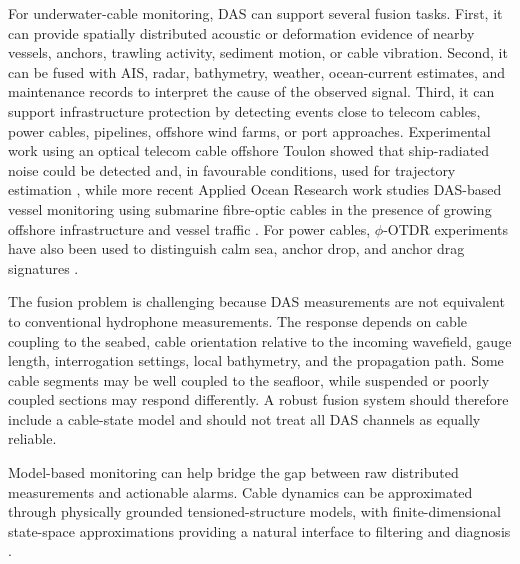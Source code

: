 \documentclass[graybox,envcountchap]{style/SNmono}
\begin{document}
For underwater-cable monitoring, DAS can support several fusion tasks. First, it can provide spatially distributed acoustic or deformation evidence of nearby vessels, anchors, trawling activity, sediment motion, or cable vibration. Second, it can be fused with AIS, radar, bathymetry, weather, ocean-current estimates, and maintenance records to interpret the cause of the observed signal. Third, it can support infrastructure protection by detecting events close to telecom cables, power cables, pipelines, offshore wind farms, or port approaches. Experimental work using an optical telecom cable offshore Toulon showed that ship-radiated noise could be detected and, in favourable conditions, used for trajectory estimation \cite{rivet_ship_2021}, while more recent Applied Ocean Research work studies DAS-based vessel monitoring using submarine fibre-optic cables in the presence of growing offshore infrastructure and vessel traffic \cite{paap_vessel_2025}. For power cables, \(\phi\)-OTDR experiments have also been used to distinguish calm sea, anchor drop, and anchor drag signatures \cite{lv_otdr_2018}.

The fusion problem is challenging because DAS measurements are not equivalent to conventional hydrophone measurements. The response depends on cable coupling to the seabed, cable orientation relative to the incoming wavefield, gauge length, interrogation settings, local bathymetry, and the propagation path. Some cable segments may be well coupled to the seafloor, while suspended or poorly coupled sections may respond differently. A robust fusion system should therefore include a cable-state model and should not treat all DAS channels as equally reliable.

Model-based monitoring can help bridge the gap between raw distributed measurements and actionable alarms. Cable dynamics can be approximated through physically grounded tensioned-structure models, with finite-dimensional state-space approximations providing a natural interface to filtering and diagnosis \cite{irvine_linear_1974,baudouin_cable_pde_2018}. 
\end{document}
